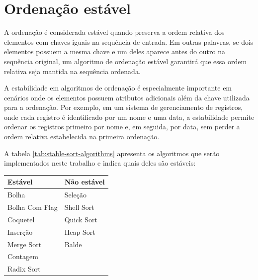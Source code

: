 \section{Ordenação estável}
A ordenação é considerada estável quando preserva a ordem relativa dos elementos com chaves iguais na sequência de entrada. Em outras palavras, se dois elementos possuem a mesma chave e um deles aparece antes do outro na sequência original, um algoritmo de ordenação estável garantirá que essa ordem relativa seja mantida na sequência ordenada.

A estabilidade em algoritmos de ordenação é especialmente importante em cenários onde os elementos possuem atributos adicionais além da chave utilizada para a ordenação. Por exemplo, em um sistema de gerenciamento de registros, onde cada registro é identificado por um nome e uma data, a estabilidade permite ordenar os registros primeiro por nome e, em seguida, por data, sem perder a ordem relativa estabelecida na primeira ordenação.

A tabela \ref{tab:stable-sort-algorithms} apresenta os algoritmos que serão implementados neste trabalho e indica quais deles são estáveis:

\begin{table}[!h]
    \centering
    \begin{tabular}{ |p{3cm}|p{3cm}|  }
    \hline
    Estável        & Não estável \\
    \hline
    Bolha          & Seleção     \\
    Bolha Com Flag & Shell Sort  \\
    Coquetel       & Quick Sort  \\
    Inserção       & Heap Sort   \\
    Merge Sort     & Balde       \\
    Contagem       &             \\
    Radix Sort     &             \\
    \hline
    \end{tabular}
\end{table}
